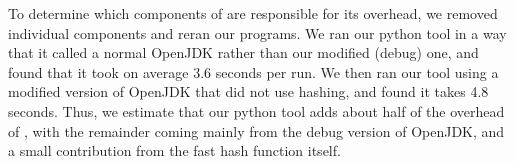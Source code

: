 To determine which components of \jcupid are responsible for its overhead, we
removed individual components and reran our programs. We ran our python tool in
a way that it called a normal OpenJDK rather than our modified (debug) one, and
found that it took on average 3.6 seconds per run. We then ran our tool using a
modified version of OpenJDK that did not use hashing, and found it takes 4.8
seconds. Thus, we estimate that our python tool adds about half of the overhead
of \jcupid,
with the remainder coming mainly from the debug version of OpenJDK, and a small
contribution from the fast hash function itself.

%
%
